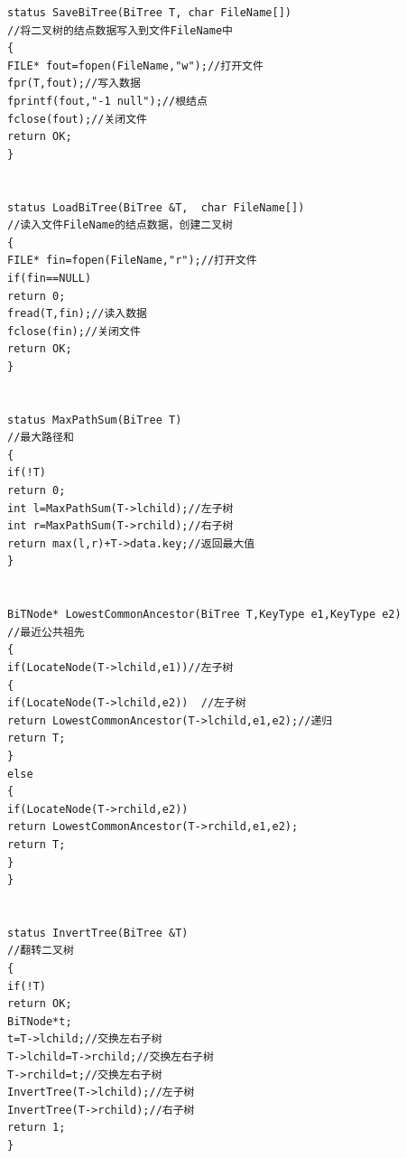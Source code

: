 \documentclass[supercite]{Experimental_Report}
\theoremstyle{definition}
\begin{document}
\begin{lstlisting}
status SaveBiTree(BiTree T, char FileName[])
//将二叉树的结点数据写入到文件FileName中
{
FILE* fout=fopen(FileName,"w");//打开文件
fpr(T,fout);//写入数据
fprintf(fout,"-1 null");//根结点
fclose(fout);//关闭文件
return OK;
}


status LoadBiTree(BiTree &T,  char FileName[])
//读入文件FileName的结点数据，创建二叉树
{
FILE* fin=fopen(FileName,"r");//打开文件
if(fin==NULL)
return 0;
fread(T,fin);//读入数据
fclose(fin);//关闭文件
return OK;
}


status MaxPathSum(BiTree T)
//最大路径和
{
if(!T) 
return 0;
int l=MaxPathSum(T->lchild);//左子树
int r=MaxPathSum(T->rchild);//右子树
return max(l,r)+T->data.key;//返回最大值
}


BiTNode* LowestCommonAncestor(BiTree T,KeyType e1,KeyType e2)
//最近公共祖先
{
if(LocateNode(T->lchild,e1))//左子树
{
if(LocateNode(T->lchild,e2))  //左子树
return LowestCommonAncestor(T->lchild,e1,e2);//递归
return T;
}
else
{
if(LocateNode(T->rchild,e2))  
return LowestCommonAncestor(T->rchild,e1,e2);
return T;
}
}


status InvertTree(BiTree &T)
//翻转二叉树
{
if(!T)  
return OK;
BiTNode*t;
t=T->lchild;//交换左右子树
T->lchild=T->rchild;//交换左右子树
T->rchild=t;//交换左右子树
InvertTree(T->lchild);//左子树
InvertTree(T->rchild);//右子树
return 1;
}
\end{lstlisting}
\newpage
\end{document}
